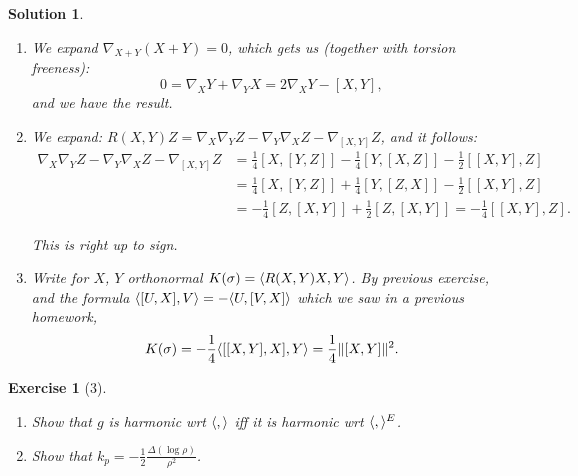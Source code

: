 \documentclass{article}
\theoremstyle{plain}
\newtheorem*{ex}{Exercise}
\theoremstyle{nonumberplain}
\newtheorem{sol}{Solution}
\DeclarePairedDelimiter{\Norm}{\lVert}{\rVert}
\DeclarePairedDelimiter{\braket}{\langle}{\rangle}
\begin{document}
\begin{sol}
\leavevmode
\begin{enumerate}
\item We expand $\nabla_{X+Y} (X+Y) = 0$, which gets us (together with torsion freeness):
\begin{equation}
0 = \nabla_X Y + \nabla_Y X = 2 \nabla_X Y - [X,Y],
\end{equation}
and we have the result.

\item We expand: $R(X,Y) Z = \nabla_X \nabla_Y Z- \nabla_Y \nabla_X Z - \nabla_{[X,Y]} Z$, and it follows:
\begin{equation}
\begin{aligned}
\nabla_X \nabla_Y Z- \nabla_Y \nabla_X Z - \nabla_{[X,Y]} Z &=
\frac14 [X, [Y, Z]] - \frac14 [Y, [X,Z]] - \frac12 [[X,Y],Z]\\
&= \frac14 [X, [Y, Z]] + \frac14 [Y, [Z,X]] - \frac12 [[X,Y],Z]\\
&= -\frac14 [Z, [X,Y]] + \frac12[Z,[X,Y]] = -\frac14 [[X,Y],Z].
\end{aligned}
\end{equation}

This is right up to sign.
\item Write for $X$, $Y$ orthonormal $K(\sigma) = \braket{R(X,Y) X, Y}$. By previous exercise, and the formula $\braket{[U,X], V} = - \braket{U,[V,X]}$ which we saw in a previous homework,
\begin{equation}
K(\sigma) = -\frac14 \braket{[[X,Y], X], Y} = \frac14 \Norm{[X,Y]}^2.
\end{equation}
\end{enumerate}
\end{sol}

\begin{ex}[3]
\leavevmode
\begin{enumerate}
\item Show that $g$ is harmonic wrt $\braket{,}$ iff it is harmonic wrt $\braket{,}^E$.
\item Show that $k_p = -\frac12 \frac{\Delta(\log \rho)}{\rho^2}$.
\end{enumerate}
\end{ex}
\end{document}
